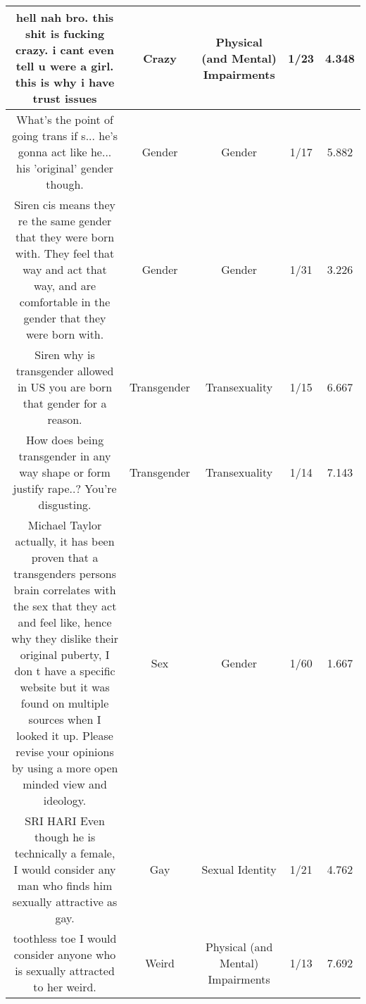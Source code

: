 \documentclass[11pt]{article}
\newlength\mylength
\begin{document}
\begin{center}
\begin{longtable}{|C{.40\mylength}|C{.30\mylength}|C{.15\mylength}|C{.15\mylength}|C{.15\mylength}|}
  hell nah bro. this shit is fucking crazy. i cant even tell u were a girl. this is why i have trust issues  & Crazy & Physical (and Mental) Impairments & 1/23 & 4.348 \\  \hline
  What's the point of going trans if s... he's gonna act like he... his 'original' gender though.  & Gender & Gender & 1/17 & 5.882 \\  \hline
  Siren cis means they re the same gender that they were born with. They feel that way and act that way, and are comfortable in the gender that they were born with.  & Gender & Gender & 1/31 & 3.226 \\  \hline
  Siren why is transgender allowed in US you are born that gender for a reason.  & Transgender & Transexuality & 1/15 & 6.667 \\  \hline
  How does being transgender in any way shape or form justify rape..? You're disgusting.  & Transgender & Transexuality & 1/14 & 7.143 \\  \hline
  Michael Taylor actually, it has been proven that a transgenders persons brain correlates with the sex that they act and feel like, hence why they dislike their original puberty, I don t have a specific website but it was found on multiple sources when I looked it up. Please revise your opinions by using a more open minded view and ideology.  & Sex & Gender & 1/60 & 1.667 \\  \hline
   SRI HARI  Even though he is technically a female, I would consider any man who finds him sexually attractive as gay.  & Gay & Sexual Identity & 1/21 & 4.762 \\  \hline
  toothless toe I would consider anyone who is sexually attracted to her weird.  & Weird & Physical (and Mental) Impairments & 1/13 & 7.692 \\  \hline

\end{longtable}
\end{center}
\end{document}
